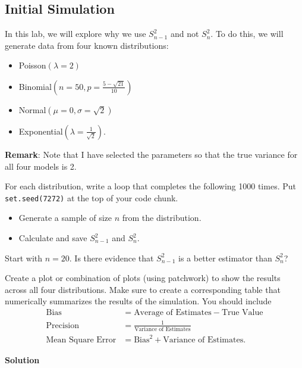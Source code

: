 \documentclass[
]{article}
\providecommand{\tightlist}{%
  \setlength{\itemsep}{0pt}\setlength{\parskip}{0pt}}
\begin{document}
\subsection{Initial Simulation}\label{initial-simulation}

In this lab, we will explore why we use \(S_{n-1}^2\) and not \(S_n^2\).
To do this, we will generate data from four known distributions:

\begin{itemize}
\tightlist
\item
  Poisson\((\lambda=2)\)
\item
  Binomial\(\left(n=50, p=\frac{5-\sqrt{21}}{10}\right)\)
\item
  Normal\((\mu=0, \sigma=\sqrt{2})\)
\item
  Exponential\(\left(\lambda = \frac{1}{\sqrt{2}}\right).\)
\end{itemize}

\textbf{Remark}: Note that I have selected the parameters so that the
true variance for all four models is 2.

For each distribution, write a loop that completes the following 1000
times. Put \texttt{set.seed(7272)} at the top of your code chunk.

\begin{itemize}
\tightlist
\item
  Generate a sample of size \(n\) from the distribution.
\item
  Calculate and save \(S_{n-1}^2\) and \(S_n^2.\)
\end{itemize}

Start with \(n=20\). Is there evidence that \(S_{n-1}^2\) is a better
estimator than \(S_n^2\)?

Create a plot or combination of plots (using patchwork) to show the
results across all four distributions. Make sure to create a
corresponding table that numerically summarizes the results of the
simulation. You should include \begin{align*}
\textrm{Bias} &= \textrm{Average of Estimates} - \textrm{True Value}\\
\textrm{Precision} &= \frac{1}{\textrm{Variance of Estimates}}\\
\textrm{Mean Square Error} &= \textrm{Bias}^2 + \textrm{Variance of Estimates}.
\end{align*}

\textbf{Solution}

\normalsize
\end{document}

